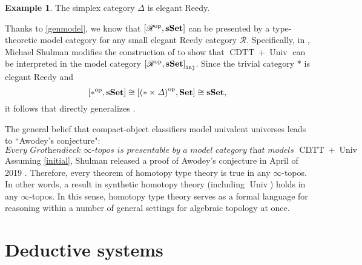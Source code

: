 \documentclass[10pt,letterpaper,cm]{nupset}
\theoremstyle{definition}
\newtheorem{exmp}[definition]{Example}
\theoremstyle{theorem}
\theoremstyle{remark}
\newcommand{\0}{\mathbf{0}}
\newcommand{\1}{\mathbf{1}}
\newcommand{\2}{\mathbf{2}}
\DeclareMathOperator{\cdtt}{\mathrm{CDTT}}
\DeclareMathOperator{\univ}{\mathrm{Univ}}
\DeclareMathOperator{\op}{op}
\DeclareMathOperator{\sset}{\mathbf{sSet}}
\DeclareMathOperator{\set}{\mathbf{Set}}
\newcommand{\rr}{\mathscr{R}}
\begin{document}
\begin{exmp}
The simplex category $\varDelta$ is elegant Reedy.
\end{exmp}

\smallskip

Thanks to \cref{genmodel}, we know that $\mleft[\rr^{\op}, \sset\mright]$ can be presented by a type-theoretic model category for  any small elegant Reedy category $\rr$. Specifically, in \cite{Shul},  Michael Shulman modifies the construction of \cite{KL} to show that $\cdtt  +\univ$ can be interpreted in the model category  $\mleft[\rr^{\op}, \sset\mright]_{\mathtt{inj}}$. Since the trivial category $\ast$ is elegant Reedy  and $$\mleft[\ast^{\op}, \sset\mright] \cong \mleft[\mleft(\ast \times \varDelta\mright)^{\op}, \set\mright] \cong \sset,$$  it follows that \cite{Shul} directly generalizes \cite{KL}.

\medskip

The general belief that compact-object classifiers model univalent universes leads to  ``Awodey's conjecture":
\[
\textit{Every Grothendieck $\infty$-topos is presentable by a model category that models $\cdtt + \univ$}.
\] Assuming \cref{initial}, Shulman released a proof of Awodey's conjecture in April of 2019 {\autocite{Shul2}}.
Therefore, every theorem of homotopy type theory is true in any $\infty$-topos.  In other words, a result in synthetic homotopy theory (including $\univ$) holds in any $\infty$-topos. In this sense, homotopy type theory serves as a formal language for reasoning within a number of general settings for algebraic topology at once.

\appendix

\section{Deductive systems}\label{natded}
\end{document}
